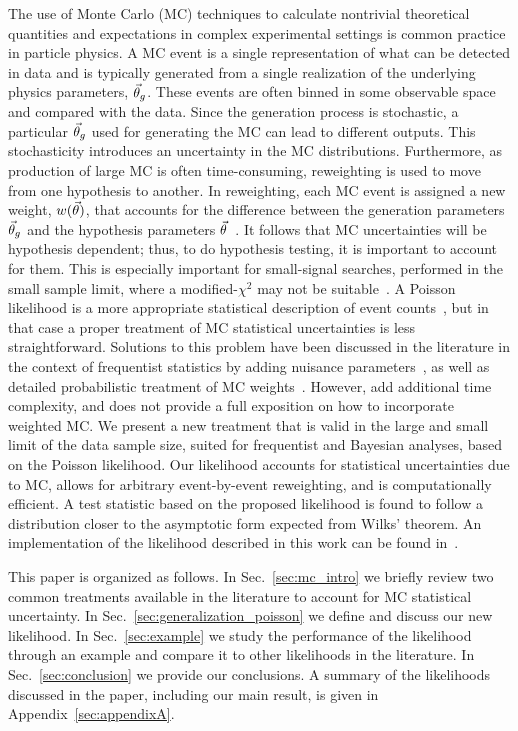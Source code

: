 The use of Monte Carlo (MC) techniques to calculate nontrivial theoretical quantities and expectations in complex experimental settings is common practice in particle physics.
A MC event is a single representation of what can be detected in data and is typically generated from a single realization of the underlying physics parameters, $\vec{\theta}_g$.
These events are often binned in some observable space and compared with the data.
Since the generation process is stochastic, a particular $\vec{\theta}_g$ used for generating the MC can lead to different outputs.
This stochasticity introduces an uncertainty in the MC distributions.
Furthermore, as production of large MC is often time-consuming, reweighting is used to move from one hypothesis to another.
In reweighting, each MC event is assigned a new weight, $w(\vec{\theta})$, that accounts for the difference between the generation parameters $\vec{\theta}_g$ and the hypothesis parameters $\vec{\theta}$~\cite{Gainer:2014bta}.
It follows that MC uncertainties will be hypothesis dependent; thus, to do hypothesis testing, it is important to account for them.
This is especially important for small-signal searches, performed in the small sample limit, where a modified-$\chi^2$ may not be suitable~\cite{Lyons:1986em}.
A Poisson likelihood is a more appropriate statistical description of event counts~\cite{poisson1837recherches}, but in that case a proper treatment of MC statistical uncertainties is less straightforward.
Solutions to this problem have been discussed in the literature in the context of frequentist statistics by adding nuisance parameters~\cite{Barlow:1993dm,Cranmer:2012sba,Chirkin:2013lya}, as well as detailed probabilistic treatment of MC weights~\cite{Glusenkamp:2017rlp}.
However, \cite{Barlow:1993dm, Chirkin:2013lya, Glusenkamp:2017rlp} add additional time complexity, and \cite{Cranmer:2012sba} does not provide a full exposition on how to incorporate weighted MC.
We present a new treatment that is valid in the large and small limit of the data sample size, suited for frequentist and Bayesian analyses, based on the Poisson likelihood.
Our likelihood accounts for statistical uncertainties due to MC, allows for arbitrary event-by-event reweighting, and is computationally efficient.
A test statistic based on the proposed likelihood is found to follow a distribution closer to the asymptotic form expected from Wilks' theorem.
An implementation of the likelihood described in this work can be found in~\cite{MCLLH}.

This paper is organized as follows.
In Sec.~\ref{sec:mc_intro} we briefly review two common treatments available in the literature to account for MC statistical uncertainty.
In Sec.~\ref{sec:generalization_poisson} we define and discuss our new likelihood.
In Sec.~\ref{sec:example} we study the performance of the likelihood through an example and compare it to other likelihoods in the literature.
In Sec.~\ref{sec:conclusion} we provide our conclusions.
A summary of the likelihoods discussed in the paper, including our main result, is given in Appendix~\ref{sec:appendixA}.

